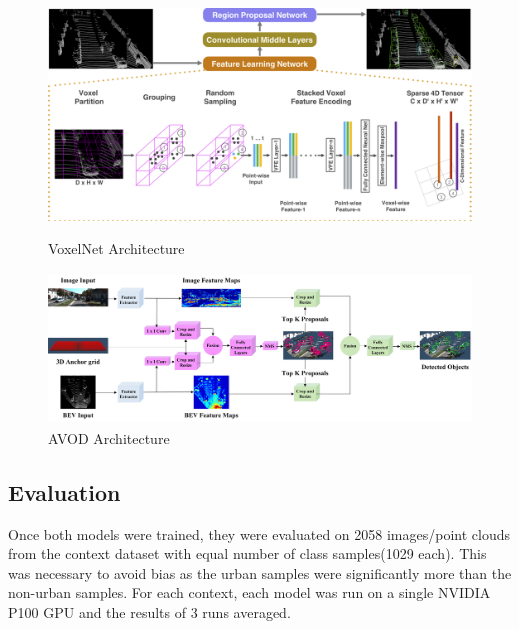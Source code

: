 \begin{figure}[H]
	\centering
	\begin{minipage}[b]{0.45\textwidth}
		\includegraphics[width=\textwidth]{images/vox_arch.png}
		\caption{VoxelNet Architecture}
		\label{fig:voxarch}
	\end{minipage}
	\hfill
	\begin{minipage}[b]{0.45\textwidth}
		\includegraphics[width=\textwidth,height=4cm]{images/avodarch.png}
		\caption{AVOD Architecture}
		\label{fig:avodarch}
	\end{minipage}
\end{figure}


\subsection{Evaluation} 

Once both models were trained, they were evaluated on 2058 images/point clouds from the context dataset with equal number of class samples(1029 each). This was necessary to avoid bias as the urban samples were significantly more than the non-urban samples. For each context, each model was run on a single NVIDIA P100 GPU and the results of 3 runs  averaged. 

